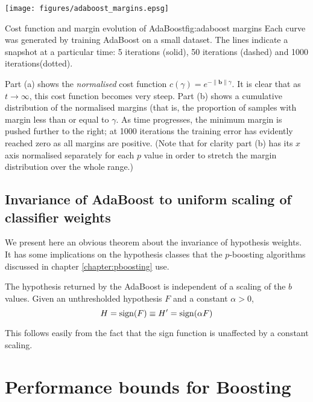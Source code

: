 \begin{linefigure}
\begin{center}
\texttt{[image: figures/adaboost\_margins.epsg]}
\end{center}
\begin{capt}{Cost function and margin evolution of
AdaBoost}{fig:adaboost margins}
Each curve was generated by training AdaBoost on a small dataset.  The
lines indicate a snapshot at a particular time: 5 iterations (solid),
50 iterations (dashed) and 1000 iterations(dotted).

Part (a) shows the \emph{normalised} cost function $c(\gamma) =
e^{-\|\mathbf{b}\| \gamma}$.  It is clear that as $t \rightarrow \infty$,
this cost function becomes very steep.  Part (b) shows a cumulative
distribution of the normalised margins (that is, the proportion of
samples with margin less than or equal to $\gamma$.  As time
progresses, the minimum margin is pushed further to the right; at 1000
iterations the training error has evidently reached zero as all
margins are positive.  (Note that for clarity part (b) has its $x$
axis normalised separately for each $p$ value in order to stretch the
margin distribution over the whole range.)
\end{capt}
\end{linefigure}


\subsection{Invariance of AdaBoost to uniform scaling of classifier
weights}

We present here an obvious theorem about the invariance of hypothesis
weights.  It has some implications on the hypothesis classes that the
$p$-boosting algorithms discussed in chapter \ref{chapter:pboosting}
use.

\begin{theorem}
\label{thm:invariance}
The hypothesis returned by the AdaBoost is independent of a 
scaling of the $b$ values.  Given an unthresholded hypothesis $F$ and
a constant $\alpha > 0$,
%
\begin{equation}
H = \mathrm{sign}(F) \equiv H' = \mathrm{sign}(\alpha F) 
\end{equation}
\end{theorem}

\proof This follows easily from the fact that the sign function is
unaffected by a constant scaling.



\section{Performance bounds for Boosting}

